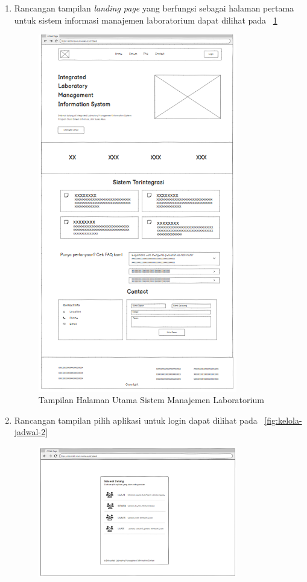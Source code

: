 \begin{enumerate}
	\item Rancangan tampilan \textit{landing page} yang berfungsi sebagai halaman pertama untuk sistem informasi manajemen laboratorium dapat dilihat pada \pic~\ref{fig:kelola-jadwal-1}
	      \begin{figure}
		      \centering
		      \includegraphics[width=0.82\textwidth]{konten/gambar/landing-page.png}
		      \caption{Tampilan Halaman Utama Sistem Manajemen Laboratorium}
		      \label{fig:kelola-jadwal-1}
	      \end{figure}
	\item Rancangan tampilan pilih aplikasi untuk login dapat dilihat pada \pic~\ref{fig:kelola-jadwal-2}
	      \begin{figure}
		      \centering
		      \includegraphics[width=0.82\textwidth]{konten/gambar/pilih-login.png}

\end{figure}
\end{enumerate}
